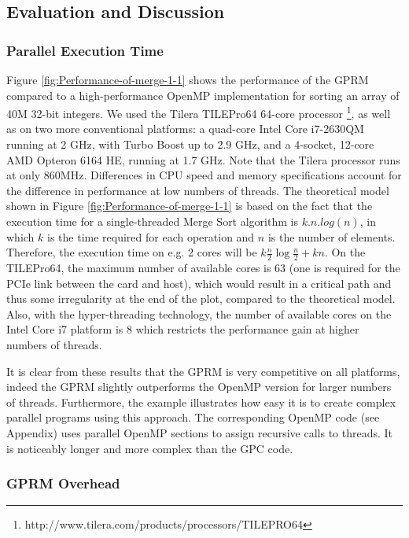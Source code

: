 \documentclass[copyright,creativecommons]{eptcs}
\begin{document}
\subsection{Evaluation and Discussion}


\subsubsection{Parallel Execution Time }

Figure \ref{fig:Performance-of-merge-1-1} shows the performance of
the GPRM compared to a high-performance OpenMP implementation \cite{radenskishared}
for sorting an array of 40M 32-bit integers. We used the Tilera TILEPro64
64-core processor \footnote{http://www.tilera.com/products/processors/TILEPRO64},
as well as on two more conventional platforms: a quad-core Intel Core
i7-2630QM running at 2 GHz, with Turbo Boost up to 2.9 GHz, and a
4-socket, 12-core AMD Opteron 6164 HE, running at 1.7 GHz. Note that
the Tilera processor runs at only 860MHz. Differences in CPU speed
and memory specifications account for the difference in performance
at low numbers of threads. The theoretical model shown in Figure \ref{fig:Performance-of-merge-1-1}
is based on the fact that the execution time for a single-threaded
Merge Sort algorithm is $k.n.log(n)$, in which $k$ is the time required
for each operation and $n$ is the number of elements. Therefore,
the execution time on e.g. 2 cores will be $k\frac{n}{2}\log\frac{n}{2}+kn$.
On the TILEPro64, the maximum number of available cores is 63 (one
is required for the PCIe link between the card and host), which would
result in a critical path and thus some irregularity at the end of
the plot, compared to the theoretical model. Also, with the hyper-threading
technology, the number of available cores on the Intel Core i7 platform
is 8 which restricts the performance gain at higher numbers of threads. 

It is clear from these results that the GPRM is very competitive on
all platforms, indeed the GPRM slightly outperforms the OpenMP version
for larger numbers of threads. Furthermore, the example illustrates
how easy it is to create complex parallel programs using this approach.
The corresponding OpenMP code (see Appendix) uses parallel OpenMP
sections to assign recursive calls to threads. It is noticeably longer
and more complex than the GPC code.


\subsubsection{GPRM Overhead}
\end{document}
